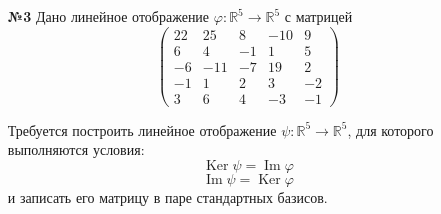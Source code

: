 \documentclass[a4paper]{article}
\newcommand{\mat}[1]{\begin{pmatrix} #1 \end{pmatrix}}
\begin{document}
\begin{enumerate}
    \item[\textbf{№3}]Дано линейное отображение $\varphi: \mathbb{R}^{5} \rightarrow \mathbb{R}^{5}$ с матрицей
    $$\mat{22 & 25 & 8 & -10 & 9 \\
    6 & 4 & -1 & 1 & 5 \\
    -6 & -11 & -7 & 19 & 2 \\
    -1 & 1 & 2 & 3 & -2 \\
    3 & 6 & 4 & -3 & -1}$$
        
    Требуется построить линейное отображение $\psi: \mathbb{R}^{5} \rightarrow \mathbb{R}^{5}$, для которого выполняются условия:
    $$
    \operatorname{Ker} \psi = \operatorname{Im} \varphi
    $$
    $$
    \operatorname{Im} \psi = \operatorname{Ker} \varphi
    $$
    и записать его матрицу в паре стандартных базисов.


\end{enumerate}
\end{document}
